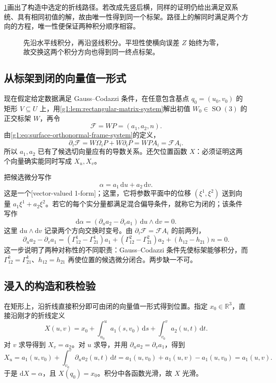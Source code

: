 \cref{g1:fig:surface-rectangle-integration}画出了构造中选定的折线路径。若改成先竖后横，同样的证明仍给出满足双系统、具有相同初值的解，故由唯一性得到同一个标架。路径上的解同时满足两个方向的方程，唯一性便保证两种积分顺序相容。

\begin{figure}[htbp]
	\centering
	
	\caption[矩形上的标架积分]{先沿水平线积分，再沿竖线积分。平坦性使横向误差 \(Z\) 始终为零，故交换这两个积分方向也得到同一终点标架。}
	\label{g1:fig:surface-rectangle-integration}
\end{figure}

\subsection{从标架到闭的向量值一形式}
\label{g1:subsec:0804:04}

现在假定给定数据满足 Gauss–Codazzi 条件，在任意包含基点 \(q_0=(u_0,v_0)\) 的矩形 \(V\subseteq U\) 上，用\cref{g1:lem:rectangular-matrix-system}解出初值 \(W_0\in \operatorname{SO}(3)\) 的正交标架 \(W\)，再令
\[
	\mathcal F=WP=(a_1,a_2,n).
\]
由\eqref{g1:eq:surface-orthonormal-frame-system}的定义，
\[
	\partial_i\mathcal F
	=W\Omega_iP+W\partial_iP
	=WPA_i=\mathcal F A_i.
\]
所以 \(a_1,a_2\) 已有了候选切向量应有的导数关系。还欠位置函数 \(X\)：必须证明这两个向量确实能同时写成 \(X_u,X_v\)。

\ProseParagraphBreak

把候选微分写作
\[
	\alpha=a_1\,\mathrm{d}u+a_2\,\mathrm{d}v.
\]
这是一个[vector-valued 1-form]；这里，它将参数平面中的位移 \((\xi^1,\xi^2)\) 送到向量 \(a_1\xi^1+a_2\xi^2\)。若它的每个实分量都满足混合偏导条件，就称它为闭的；该条件写作
\[
	\mathrm{d}\alpha=(\partial_u a_2-\partial_v a_1)\,\mathrm{d}u\wedge \mathrm{d}v=0.
\]
这里 \(\mathrm{d}u\wedge \mathrm{d}v\) 记录两个方向交换时变号。由 \(\partial_i\mathcal F=\mathcal F A_i\) 的前两列，
\[
	\partial_u a_2-\partial_v a_1
	=(\Gamma^1_{12}-\Gamma^1_{21})a_1
	+(\Gamma^2_{12}-\Gamma^2_{21})a_2+(h_{12}-h_{21})n=0.
\]
这一步说明了两种对称性的不同职责：Gauss–Codazzi 条件先使标架能够积分，而 \(\Gamma^k_{12}=\Gamma^k_{21}\)、\(h_{12}=h_{21}\) 再使位置的候选微分闭合。两步缺一不可。

\subsection{浸入的构造和秩检验}
\label{g1:subsec:0804:05}

在矩形上，沿折线直接积分即可由闭的向量值一形式得到位置。指定 \(x_0\in\mathbb R^3\)，直接沿刚才的折线定义
\begin{equation}
	\label{g1:eq:surface-position-rectangle-integral}
	X(u,v)=x_0+\int_{u_0}^u a_1(s,v_0)\,\mathrm{d}s+\int_{v_0}^v a_2(u,t)\,\mathrm{d}t.
\end{equation}
对 \(v\) 求导得到 \(X_v=a_2\)。对 \(u\) 求导，并用 \(\partial_u a_2=\partial_v a_1\)，得到
\[
	X_u=a_1(u,v_0)+\int_{v_0}^v\partial_u a_2(u,t)\,\mathrm{d}t
	=a_1(u,v_0)+a_1(u,v)-a_1(u,v_0)=a_1(u,v).
\]
于是 \(\mathrm{d}X=\alpha\)，且 \(X(q_0)=x_0\)。积分中各函数光滑，故 \(X\) 光滑。

